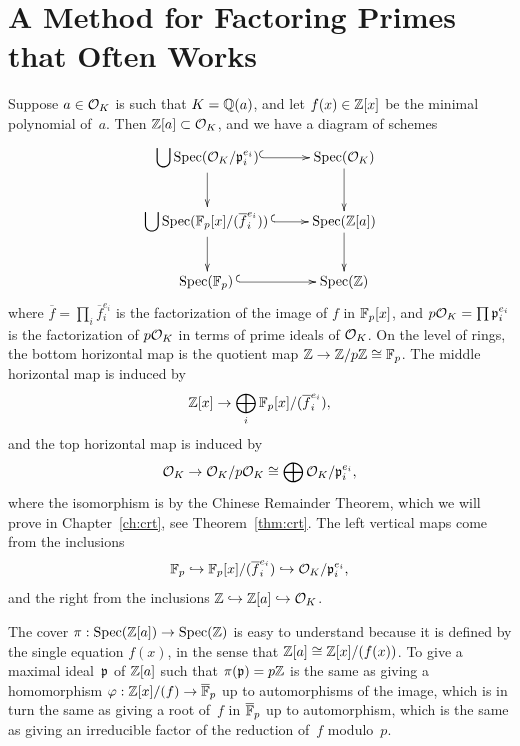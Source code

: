 \section{A Method for Factoring Primes that Often Works}
Suppose $a\in\mathcal{O}_K$ is such that $K=\mathbb{Q}(a)$, and let
$f(x)\in\mathbb{Z}[x]$ be the minimal polynomial of~$a$.  Then
$\mathbb{Z}[a]\subset \mathcal{O}_K$, and we have a diagram of schemes
$$\xymatrix{
  {{\ds \bigcup}\Spec(\O_K/\p_i^{e_i})}\ar@{^(->}[r]\ar[d]               &{\Spec(\O_K)}\ar[d]  \\
{{\ds \bigcup}\Spec(\F_p[x]/(\overline{f}_i^{e_i}))\,}\ar@{^(->}[r] \ar[d]
         &{\Spec(\Z[a])}\ar[d] \\%
{\Spec(\F_p)\,}\ar@{^(->}[r]&{\Spec(\Z)}
}$$
where $\overline{f} = \prod_i \overline{f}_i^{e_i}$
is the factorization of the image of $f$ in $\mathbb{F}_p[x]$,
and $p\mathcal{O}_K = \prod \mathfrak{p}_i^{e_i}$ is the factorization
of $p\mathcal{O}_K$ in terms of prime ideals of $\mathcal{O}_K$.  
On the level of rings, the bottom horizontal map
is the quotient map $\mathbb{Z}\to\mathbb{Z}/p\mathbb{Z}\cong \mathbb{F}_p$.
The middle horizontal map is induced by 
$$
  \mathbb{Z}[x] \to \bigoplus_i \mathbb{F}_p[x]/(\overline{f}_i^{e_i}),
$$
and the top horizontal map is induced by
$$
  \mathcal{O}_K \to \mathcal{O}_K/p\mathcal{O}_K \cong \bigoplus \mathcal{O}_K/\mathfrak{p}_i^{e_i},
$$
where the isomorphism is by the Chinese Remainder Theorem,
which we will prove in Chapter~\ref{ch:crt}, see Theorem~\ref{thm:crt}.
The left vertical maps come from the inclusions
$$
   \mathbb{F}_p \hookrightarrow \mathbb{F}_p[x]/(\overline{f}_i^{e_i}) \hookrightarrow \mathcal{O}_K/\mathfrak{p}_i^{e_i},
$$
and the right from the inclusions $\mathbb{Z}\hookrightarrow\mathbb{Z}[a]\hookrightarrow\mathcal{O}_K$.

The cover $\pi:\operatorname{Spec}(\mathbb{Z}[a])\rightarrow \operatorname{Spec}(\mathbb{Z})$ is easy to understand
because it is defined by the single equation $f(x)$, in the sense
that $\mathbb{Z}[a]\cong \mathbb{Z}[x]/(f(x))$.  To give a
maximal ideal~$\mathfrak{p}$ of $\mathbb{Z}[a]$ such that $\pi(\mathfrak{p}) = p\mathbb{Z}$ is the
same as giving a homomorphism $\varphi:\mathbb{Z}[x]/(f) \rightarrow \overline{\mathbb{F}}_p$ up to
automorphisms of the image, which is in turn the same as giving a
root of~$f$ in $\overline{\mathbb{F}}_p$ up to automorphism, which is the same
as giving an irreducible factor of the reduction of~$f$ modulo~$p$.

